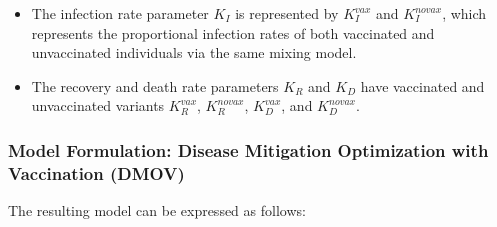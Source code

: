 \documentclass{article}
\newcommand{\modelvax}{{\bf (DMOV) }}
\begin{document}
\begin{itemize}
    \item The infection rate parameter $K_I$ is represented by $K_I^{vax}$ and $K_I^{novax}$, which represents the proportional infection rates of both vaccinated and unvaccinated individuals via the same mixing model.

    \item The recovery and death rate parameters $K_R$ and $K_D$ have vaccinated and unvaccinated variants $K_R^{vax}$, $K_R^{novax}$, $K_D^{vax}$, and $K_D^{novax}$.
\end{itemize}


\subsubsection*{Model Formulation: Disease Mitigation Optimization with Vaccination \modelvax}\label{subsec:mathprogram_vax}

The resulting model can be expressed as follows:
\end{document}
